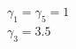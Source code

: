 \documentclass[preview]{standalone}
\begin{document}
\begin{center}
$\gamma_1 = \gamma_5 = 1$\\$\gamma_3 = 3.5$
\end{center}
\end{document}
